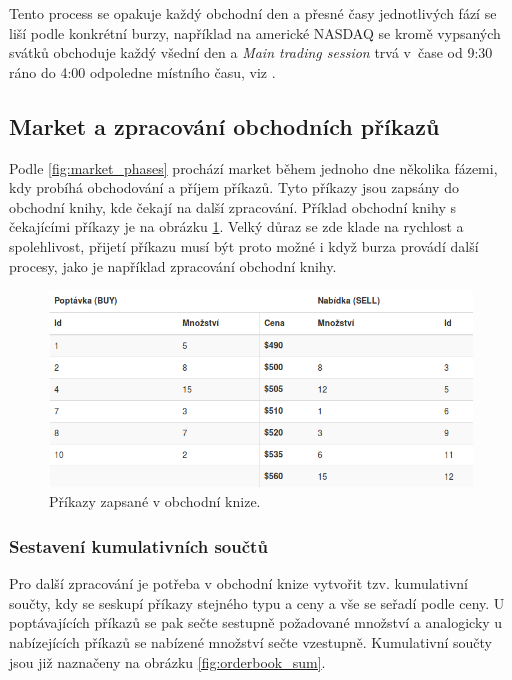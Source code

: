 \documentclass[thesis=M,czech]{FITthesis}[2012/06/26]
\begin{document}
	Tento process se opakuje každý obchodní den a přesné časy jednotlivých fází se liší podle konkrétní burzy, například na americké NASDAQ se kromě vypsaných svátků obchoduje každý všední den a \textit{Main trading session} trvá v~čase od 9:30 ráno do 4:00 odpoledne místního času, viz \cite{NASDAQTradingSchedule}.

\subsection{Market a zpracování obchodních příkazů}
\label{sec:order_process}
	Podle \ref{fig:market_phases} prochází market během jednoho dne několika fázemi, kdy probíhá obchodování a příjem příkazů. Tyto příkazy jsou zapsány do obchodní knihy, kde čekají na další zpracování. Příklad obchodní knihy s čekajícími příkazy je na obrázku \ref{fig:orderbook}. Velký důraz se zde klade na rychlost a spolehlivost, přijetí příkazu musí být proto možné i když burza provádí další procesy, jako je například zpracování obchodní knihy.

\begin{figure}[h]
	\centering
	\includegraphics[width=1\textwidth]{images/orderbook}
 	\caption[Příkazy zapsané v obchodní knize]{Příkazy zapsané v obchodní knize.}
 	\label{fig:orderbook} 	
\end{figure}

\subsubsection{Sestavení kumulativních součtů}
	
	Pro další zpracování je potřeba v obchodní knize vytvořit tzv. kumulativní součty, kdy se seskupí příkazy stejného typu a ceny a vše se seřadí podle ceny. U poptávajících příkazů se pak sečte sestupně požadované množství a analogicky u nabízejících příkazů se nabízené množství sečte vzestupně. Kumulativní součty jsou již naznačeny na obrázku \ref{fig:orderbook_sum}.
	
\end{document}
